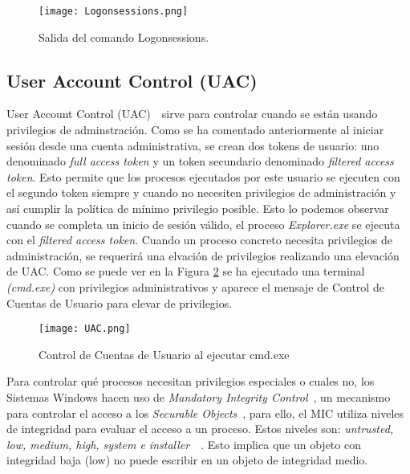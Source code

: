 \begin{figure}[t!] %
\begin{center}
\texttt{[image: Logonsessions.png]}
\end{center}
\caption{Salida del comando Logonsessions.}
\label{Logonsessions}
\end{figure}

\subsection{User Account Control (UAC)}

User Account Control (UAC)~\cite{Capitulo2:UAC}~\cite{Capitulo2:UAC2}sirve para controlar cuando se están usando privilegios de adminstración. Como se ha comentado anteriormente al iniciar sesión desde una cuenta administrativa, se crean dos tokens de usuario: uno denominado {\it full access token} y un token secundario denominado {\it filtered access token}. Esto permite que los procesos ejecutados por este usuario se ejecuten con el segundo token siempre y cuando no necesiten privilegios de administración y así cumplir la política de mínimo privilegio posible. Esto lo podemos observar cuando se completa un inicio de sesión válido, el proceso {\it Explorer.exe} se ejecuta con el {\it filtered access token}. Cuando un proceso concreto necesita privilegios de administración, se requerirá una elvación de privilegios realizando una elevación de UAC. Como se puede ver en la Figura \ref{UAC} se ha ejecutado una terminal {\it (cmd.exe)} con privilegios administrativos y aparece el mensaje de Control de Cuentas de Usuario para elevar de privilegios. \\


\begin{figure}[t!] %
\begin{center}
\texttt{[image: UAC.png]}
\end{center}
\caption{Control de Cuentas de Usuario al ejecutar cmd.exe}
\label{UAC}
\end{figure}

Para controlar qué procesos necesitan privilegios especiales o cuales no, los Sistemas Windows hacen uso de {\it Mandatory Integrity Control}~\cite{Capitulo2:MIC}, un mecanismo para controlar el acceso a los {\it Securable Objects}~\cite{Capitulo2:Securable-Objects}, para ello, el MIC utiliza niveles de integridad para evaluar el acceso a un proceso. Estos niveles son: {\it untrusted, low, medium, high, system e installer}~\cite{Capitulo2:IntegrityLabels}~\cite{Capitulo2:IntegrityLabels2}. Esto implica que un objeto con integridad baja (low) no puede escribir en un objeto de integridad medio. \\

